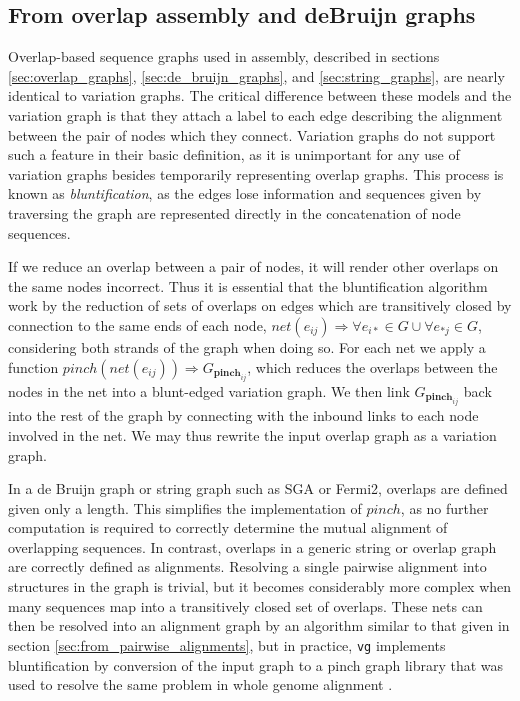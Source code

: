 \subsection{From overlap assembly and deBruijn graphs}

Overlap-based sequence graphs used in assembly, described in sections \ref{sec:overlap_graphs}, \ref{sec:de_bruijn_graphs}, and \ref{sec:string_graphs}, are nearly identical to variation graphs.
The critical difference between these models and the variation graph is that they attach a label to each edge describing the alignment between the pair of nodes which they connect.
Variation graphs do not support such a feature in their basic definition, as it is unimportant for any use of variation graphs besides temporarily representing overlap graphs.
This process is known as \emph{bluntification}, as the edges lose information and sequences given by traversing the graph are represented directly in the concatenation of node sequences.

If we reduce an overlap between a pair of nodes, it will render other overlaps on the same nodes incorrect.
Thus it is essential that the bluntification algorithm work by the reduction of sets of overlaps on edges which are transitively closed by connection to the same ends of each node, $net(e_{ij}) \Rightarrow \forall e_{i*} \in G \cup \forall e_{*j} \in G$, considering both strands of the graph when doing so.
For each net we apply a function $pinch(net(e_{ij})) \Rightarrow G_{\textbf{pinch}_{ij}}$, which reduces the overlaps between the nodes in the net into a blunt-edged variation graph.
We then link $G_{\textbf{pinch}_{ij}}$ back into the rest of the graph by connecting with the inbound links to each node involved in the net.
We may thus rewrite the input overlap graph as a variation graph.

In a de Bruijn graph or string graph such as SGA or Fermi2, overlaps are defined given only a length.
This simplifies the implementation of $pinch$, as no further computation is required to correctly determine the mutual alignment of overlapping sequences.
In contrast, overlaps in a generic string or overlap graph are correctly defined as alignments.
Resolving a single pairwise alignment into structures in the graph is trivial, but it becomes considerably more complex when many sequences map into a transitively closed set of overlaps.
These nets can then be resolved into an alignment graph by an algorithm similar to that given in section \ref{sec:from_pairwise_alignments}, but in practice, {\tt vg} implements bluntification by conversion of the input graph to a pinch graph library that was used to resolve the same problem in whole genome alignment \cite{Paten:2011fva}.

